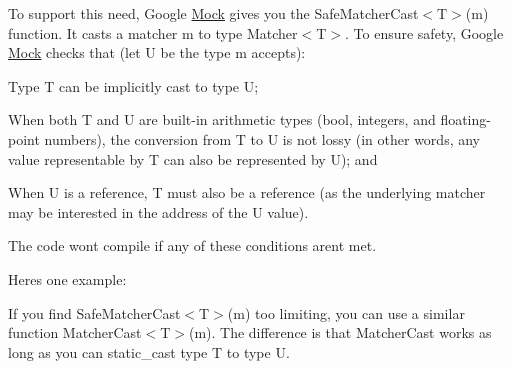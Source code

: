 To support this need, Google \mbox{\hyperlink{class_mock}{Mock}} gives you the {\ttfamily Safe\+Matcher\+Cast$<$T$>$(m)} function. It casts a matcher {\ttfamily m} to type {\ttfamily Matcher$<$T$>$}. To ensure safety, Google \mbox{\hyperlink{class_mock}{Mock}} checks that (let {\ttfamily U} be the type {\ttfamily m} accepts)\+:


\begin{DoxyEnumerate}
\item Type {\ttfamily T} can be implicitly cast to type {\ttfamily U};
\end{DoxyEnumerate}
\begin{DoxyEnumerate}
\item When both {\ttfamily T} and {\ttfamily U} are built-\/in arithmetic types ({\ttfamily bool}, integers, and floating-\/point numbers), the conversion from {\ttfamily T} to {\ttfamily U} is not lossy (in other words, any value representable by {\ttfamily T} can also be represented by {\ttfamily U}); and
\end{DoxyEnumerate}
\begin{DoxyEnumerate}
\item When {\ttfamily U} is a reference, {\ttfamily T} must also be a reference (as the underlying matcher may be interested in the address of the {\ttfamily U} value).
\end{DoxyEnumerate}

The code won\textquotesingle{}t compile if any of these conditions aren\textquotesingle{}t met.

Here\textquotesingle{}s one example\+:


\begin{DoxyCode}{0}
\DoxyCodeLine{}
\DoxyCodeLine{}
\DoxyCodeLine{\};}
\DoxyCodeLine{}
\end{DoxyCode}


If you find {\ttfamily Safe\+Matcher\+Cast$<$T$>$(m)} too limiting, you can use a similar function {\ttfamily Matcher\+Cast$<$T$>$(m)}. The difference is that {\ttfamily Matcher\+Cast} works as long as you can {\ttfamily static\+\_\+cast} type {\ttfamily T} to type {\ttfamily U}.


